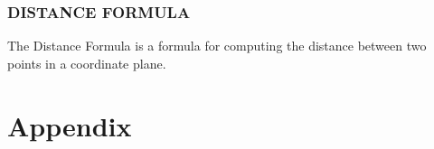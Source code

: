 \documentclass[
  12pt,
  a4paper,
  twoside,
  openright,
]{memoir}
\begin{document}
\subsection{DISTANCE FORMULA}

The Distance Formula is a formula for computing the
distance between two points in a coordinate plane.


\backmatter

\chapter{Appendix}

\lipsum[21-22]
\end{document}
